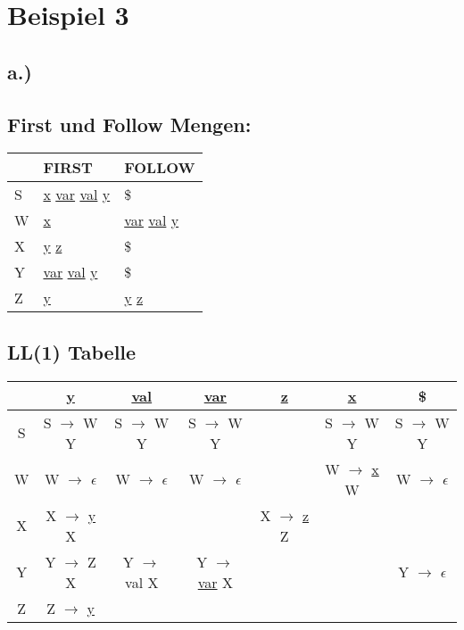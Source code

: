 \documentclass[12pt,runningheads,a4paper]{llncs}
\begin{document}
\section*{Beispiel 3}
\subsection*{a.)}
\subsection*{First und Follow Mengen:}

\begin{table}[htbp]
    \centering
      \begin{tabular}{|m{1cm}|m{2cm}|m{2cm}|}
\hline
 &FIRST & FOLLOW \\ \hline
S & \underline{x} \underline{var} \underline{val} \underline{y} & \$ \\ \hline
W & \underline{x} & \underline{var} \underline{val} \underline{y}\\ \hline
X & \underline{y} \underline{z} & \$ \\ \hline
Y & \underline{var} \underline{val} \underline{y} & \$ \\ \hline
Z & \underline{y} & \underline{y} \underline{z}\\ 
\hline
        \end{tabular}
\end{table}


\subsection*{LL(1) Tabelle}

\begin{table}[htbp]
    \centering
      \begin{tabular}{|c|c|c|c|c|c|c|}
\hline
   & \underline{y} & \underline{val} & \underline{var} & \underline{z} & \underline{x} & \$ \\ \hline
S & S $\rightarrow$ W Y & S $\rightarrow$ W Y & S $\rightarrow$ W Y &   & S $\rightarrow$ W Y & S $\rightarrow$ W Y \\ \hline
W & W $\rightarrow$ $\epsilon$ & W $\rightarrow$ $\epsilon$ & W $\rightarrow$ $\epsilon$ &   & W $\rightarrow$ \underline{x} W & W $\rightarrow$ $\epsilon$ \\ \hline
X & X $\rightarrow$ \underline{y} X &   &   & X $\rightarrow$ \underline{z} Z &  &   \\ \hline
Y  & Y $\rightarrow$ Z X & Y $\rightarrow$ val X & Y $\rightarrow$ \underline{var} X &   &  & Y $\rightarrow$ $\epsilon$\\ \hline
Z & Z $\rightarrow$ \underline{y} &   &   &   &  &   \\
\hline
        \end{tabular}
\end{table}
\end{document}
